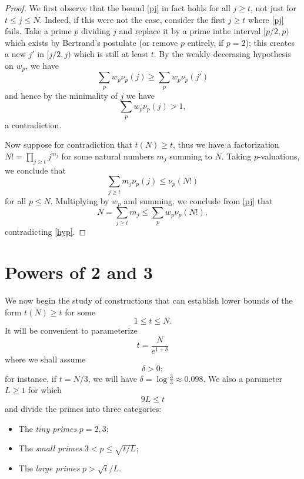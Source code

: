 \documentclass[12pt,a4paper,reqno]{amsart}
\numberwithin{equation}{section}
\theoremstyle{plain}
\theoremstyle{definition}
\begin{document}
\begin{proof}
We first observe that the bound \eqref{pj} in fact holds for all $j \geq t$, not just for $t \leq j \leq N$.  Indeed, if this were not the case, consider the first $j \geq t$ where \eqref{pj} fails.  Take a prime $p$ dividing $j$ and replace it by a prime inthe interval $[p/2,p)$ which exists by Bertrand's postulate (or remove $p$ entirely, if $p=2$); this creates a new $j'$ in $[j/2,j)$ which is still at least $t$.  By the weakly decerasing hypothesis on $w_p$, we have
$$ \sum_p w_p \nu_p(j) \geq \sum_p w_p \nu_p(j')$$
and hence by the minimality of $j$ we have
$$ \sum_p w_p \nu_p(j) > 1, $$
a contradiction.

Now suppose for contradiction that $t(N) \geq t$, thus we have a factorization $N! = \prod_{j \geq t} j^{m_j}$ for some natural numbers $m_j$ summing to $N$.  Taking $p$-valuations, we conclude that
$$ \sum_{j \geq t} m_j \nu_p(j) \leq \nu_p(N!)$$
for all $p \leq N$.  Multiplying by $w_p$ and summing, we conclude from \eqref{pj} that
$$ N = \sum_{j \geq t} m_j \leq \sum_p w_p \nu_p(N!),$$
contradicting \eqref{hyp}.
\end{proof}


\section{Powers of 2 and 3}

We now begin the study of constructions that can establish lower bounds of the form $t(N) \geq t$ for some 
\begin{equation}\label{tn}
  1 \leq t \leq N.  
\end{equation}
It will be convenient to parameterize
\begin{equation}\label{tparam}
  t = \frac{N}{e^{1+\delta}}
\end{equation}
where we shall assume
\begin{equation}\label{delta-pos}
\delta > 0;
\end{equation}
for instance, if $t=N/3$, we will have $\delta = \log \frac{3}{3} \approx 0.098$.  We also a parameter $L \geq 1$ for which
\begin{equation}\label{tl}
  9L \leq t
\end{equation}
and divide the primes into three categories:
\begin{itemize}
\item The \emph{tiny primes} $p=2,3$;
\item The \emph{small primes} $3 < p \leq \sqrt{t/L}$;
\item The \emph{large primes} $p > \sqrt{t}/L$.
\end{itemize}
\end{document}
